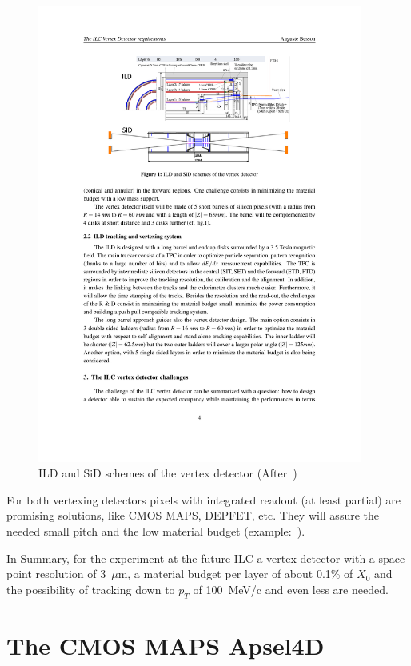 \begin{figure}
\centering
\includegraphics[width=0.95\textwidth]{ILC_concepts.pdf}
\caption{\label{fig:ILC_concepts}ILD and SiD schemes of the vertex detector (After~\cite{ILCVertexing2016})}
\end{figure}

For both vertexing detectors pixels with integrated readout (at least partial) are promising solutions, 
like CMOS MAPS, DEPFET, etc. They will assure the needed small pitch and the low material 
budget (example:~\cite{mimosa26}). 

In Summary, for the experiment at the future ILC a vertex detector with a space point resolution of 
3~$\mu$m, a material budget per layer of about 0.1\% of $X_0$ and the possibility  of    
tracking down to $p_T$ of 100~MeV/c and even less are needed.



\section{The CMOS MAPS Apsel4D}
\label{sec:Apsel4D}

